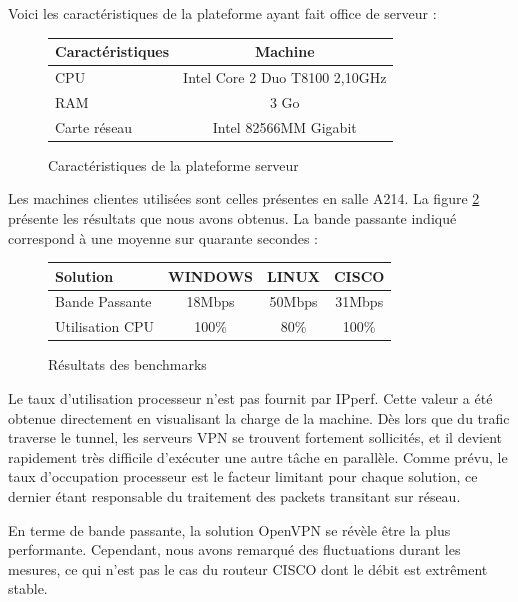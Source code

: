 Voici les caractéristiques de la plateforme ayant fait office de serveur :
\begin{figure}[H]
	\begin{center}
\begin{tabular}{l|c}
Caractéristiques & Machine \\
\hline
CPU & Intel Core 2 Duo T8100 2,10GHz \\
RAM & 3 Go \\
Carte réseau & Intel 82566MM Gigabit \\
\end{tabular}
	\end{center}
	\caption{Caractéristiques de la plateforme serveur}
	\label{Caractéristique_de_la_plateforme_serveur}
\end{figure}

Les machines clientes utilisées sont celles présentes en salle A214. La figure \ref{Résultat_des_benchmarks} présente les résultats que nous avons obtenus. La bande passante indiqué correspond à une moyenne sur quarante secondes :

\begin{figure}[H]
	\begin{center}
\begin{tabular}{l|c|c|c}
Solution & WINDOWS & LINUX & CISCO \\
\hline
Bande Passante & 18Mbps & 50Mbps & 31Mbps \\
Utilisation CPU & 100\% & 80\% & 100\% \\
\end{tabular}
	\end{center}
	\caption{Résultats des benchmarks}
	\label{Résultat_des_benchmarks}
\end{figure}

Le taux d'utilisation processeur n'est pas fournit par IPperf. Cette valeur a été obtenue directement en visualisant la charge de la machine. Dès lors que du trafic traverse le tunnel, les serveurs VPN se trouvent fortement sollicités, et il devient rapidement très difficile d'exécuter une autre tâche en parallèle. Comme prévu, le taux d'occupation processeur est le facteur limitant pour chaque solution, ce dernier étant responsable du traitement des packets transitant sur réseau.

En terme de bande passante, la solution OpenVPN se révèle être la plus performante. Cependant, nous avons remarqué des fluctuations durant les mesures, ce qui n'est pas le cas du routeur CISCO dont le débit est extrêment stable.
